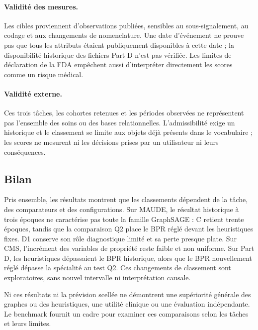 \paragraph{Validité des mesures.} Les cibles proviennent d'observations publiées, sensibles au sous-signalement, au codage et aux changements de nomenclature. Une date d'événement ne prouve pas que tous les attributs étaient publiquement disponibles à cette date ; la disponibilité historique des fichiers Part D n'est pas vérifiée\cite{hgbresults}. Les limites de déclaration de la FDA empêchent aussi d'interpréter directement les scores comme un risque médical\cite{fda2026}.

\paragraph{Validité externe.} Ces trois tâches, les cohortes retenues et les périodes observées ne représentent pas l'ensemble des soins ou des bases relationnelles. L'admissibilité exige un historique et le classement se limite aux objets déjà présents dans le vocabulaire ; les scores ne mesurent ni les décisions prises par un utilisateur ni leurs conséquences.

\subsection{Bilan}

Pris ensemble, les résultats montrent que les classements dépendent de la tâche, des comparateurs et des configurations. Sur MAUDE, le résultat historique à trois époques ne caractérise pas toute la famille GraphSAGE : C retient trente époques, tandis que la comparaison Q2 place le BPR réglé devant les heuristiques fixes. D1 conserve son rôle diagnostique limité et sa perte presque plate. Sur CMS, l'incrément des variables de propriété reste faible et non uniforme. Sur Part D, les heuristiques dépassaient le BPR historique, alors que le BPR nouvellement réglé dépasse la spécialité au test Q2. Ces changements de classement sont exploratoires, sans nouvel intervalle ni interprétation causale.

Ni ces résultats ni la prévision scellée ne démontrent une supériorité générale des graphes ou des heuristiques, une utilité clinique ou une évaluation indépendante. Le benchmark fournit un cadre pour examiner ces comparaisons selon les tâches et leurs limites.


